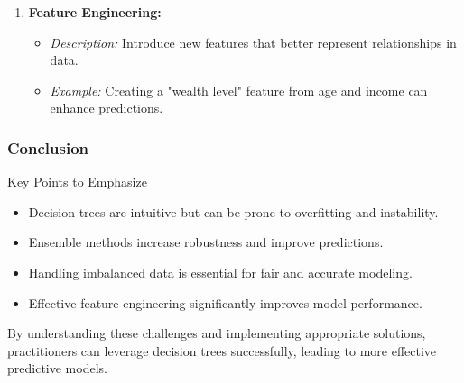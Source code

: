 \documentclass[aspectratio=169]{beamer}
\begin{document}
\begin{frame}[fragile]
\begin{enumerate}
        \item \textbf{Feature Engineering:}
            \begin{itemize}
                \item \textit{Description:} Introduce new features that better represent relationships in data.
                \item \textit{Example:} Creating a "wealth level" feature from age and income can enhance predictions.
            \end{itemize}
    \end{enumerate}
\end{frame}

\begin{frame}[fragile]
    \frametitle{Conclusion}

    \begin{block}{Key Points to Emphasize}
        \begin{itemize}
            \item Decision trees are intuitive but can be prone to overfitting and instability.
            \item Ensemble methods increase robustness and improve predictions.
            \item Handling imbalanced data is essential for fair and accurate modeling.
            \item Effective feature engineering significantly improves model performance.
        \end{itemize}
    \end{block}

    By understanding these challenges and implementing appropriate solutions, practitioners can leverage decision trees successfully, leading to more effective predictive models.
\end{frame}
\end{document}
